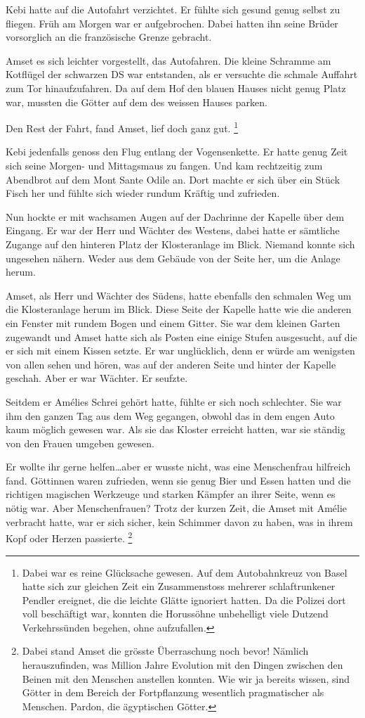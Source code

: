 \documentclass[11pt,titlepage,a5paper]{book}
\begin{document}
Kebi hatte auf die Autofahrt verzichtet. Er fühlte sich gesund genug selbst zu fliegen. Früh am Morgen war er aufgebrochen. Dabei hatten ihn seine Brüder vorsorglich an die französische Grenze gebracht. 

Amset es sich leichter vorgestellt, das Autofahren. Die kleine Schramme am Kotflügel der schwarzen DS war entstanden, als er versuchte die schmale Auffahrt zum Tor hinaufzufahren. Da auf dem Hof den blauen Hauses nicht genug Platz war, mussten die Götter auf dem des weissen Hauses parken.

Den Rest der Fahrt, fand Amset, lief doch ganz gut. \footnote{Dabei war es reine Glücksache gewesen. Auf dem Autobahnkreuz von Basel hatte sich zur gleichen Zeit ein Zusammenstoss mehrerer schlaftrunkener Pendler ereignet, die die leichte Glätte ignoriert hatten. Da die Polizei dort voll beschäftigt war, konnten die Horussöhne unbehelligt viele Dutzend Verkehrssünden begehen, ohne aufzufallen.}

Kebi jedenfalls genoss den Flug entlang der Vogensenkette. Er hatte genug Zeit sich seine Morgen- und Mittagsmaus zu fangen. Und kam rechtzeitig zum Abendbrot auf dem Mont Sante Odile an. Dort machte er sich über ein Stück Fisch her und fühlte sich wieder rundum Kräftig und zufrieden.

Nun hockte er mit wachsamen Augen auf der Dachrinne der Kapelle über dem Eingang. Er war der Herr und Wächter des Westens, dabei hatte er sämtliche Zugange auf den hinteren Platz der Klosteranlage im Blick. Niemand konnte sich ungesehen nähern. Weder aus dem Gebäude von der Seite her, um die Anlage herum.

Amset, als Herr und Wächter des Südens, hatte ebenfalls den schmalen Weg um die Klosteranlage herum im Blick. Diese Seite der Kapelle hatte wie die anderen ein Fenster mit rundem Bogen und einem Gitter. Sie war dem kleinen Garten zugewandt und Amset hatte sich als Posten eine einige Stufen ausgesucht, auf die er sich mit einem Kissen setzte. Er war unglücklich, denn er würde am wenigsten von allen sehen und hören, was auf der anderen Seite und hinter der Kapelle geschah. Aber er war Wächter. Er seufzte.

Seitdem er Amélies Schrei gehört hatte, fühlte er sich noch schlechter. Sie war ihm den ganzen Tag aus dem Weg gegangen, obwohl das in dem engen Auto kaum möglich gewesen war. Als sie das Kloster erreicht hatten, war sie ständig von den Frauen umgeben gewesen. 

Er wollte ihr gerne helfen\dots aber er wusste nicht, was eine Menschenfrau hilfreich fand. Göttinnen waren zufrieden, wenn sie genug Bier und Essen hatten und die richtigen magischen Werkzeuge und starken Kämpfer an ihrer Seite, wenn es nötig war. Aber Menschenfrauen? Trotz der kurzen Zeit, die Amset mit Amélie verbracht hatte, war er sich sicher, kein Schimmer davon zu haben, was in ihrem Kopf oder Herzen passierte. \footnote{Dabei stand Amset die grösste Überraschung noch bevor! Nämlich herauszufinden, was Million Jahre Evolution mit den Dingen zwischen den Beinen mit den Menschen anstellen konnten. Wie wir ja bereits wissen, sind Götter in dem Bereich der Fortpflanzung wesentlich pragmatischer als Menschen. Pardon, die ägyptischen Götter.} 
\end{document}
